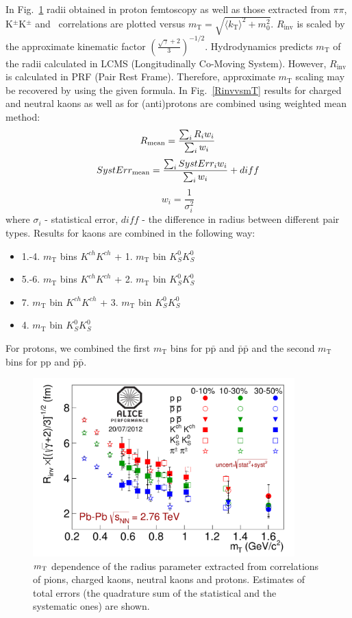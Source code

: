 In Fig.~\ref{RinvvsmT2} radii obtained in proton femtoscopy as well as those extracted from $\pi\pi$, K$^{\pm}$K$^{\pm}$ and \Kzs\Kzs~correlations are plotted versus $m_{\mathrm{T}} = \sqrt{\langle k_{\mathrm{T}} \rangle^2+m_{\mathrm{0}}^2}$. $R_{\mathrm{inv}}$ is scaled by the approximate kinematic factor $(\frac{\sqrt{\gamma}+2}{3})^{-1/2}$. Hydrodynamics predicts $m_{\mathrm{T}}$ of the radii calculated in LCMS (Longitudinally Co-Moving System). However, $R_{\mathrm{inv}}$ is calculated in PRF (Pair Rest Frame). Therefore, approximate $m_{\mathrm{T}}$ scaling may be recovered by using the given formula.
In Fig.~\ref{RinvvsmT} results for charged and neutral kaons as well as for (anti)protons are combined using weighted mean method:
\begin{equation}
  R_{\rm mean}=\frac{\sum_i R_i w_i}{\sum_i w_i}
  \nonumber
\end{equation}
\begin{equation}
  SystErr_{\rm mean}=\frac{\sum_i SystErr_i w_i}{\sum_i w_i}+diff
  \nonumber
\end{equation}\begin{equation}
  w_i=\frac{1}{\sigma_i^2}
  \nonumber
\end{equation}
where
$\sigma_i$ - statistical error, $diff$ - the difference in radius between different pair types. Results for kaons are combined in the following way:
\begin{itemize}
\item 1.-4. $m_\mathrm{T}$ bins $K^{ch}K^{ch}$ + 1. $m_\mathrm{T}$ bin $K_S^0K_S^0$
\item 5.-6. $m_\mathrm{T}$ bins $K^{ch}K^{ch}$ + 2. $m_\mathrm{T}$ bin $K_S^0K_S^0$
\item 7. $m_\mathrm{T}$ bin $K^{ch}K^{ch}$ + 3. $m_\mathrm{T}$ bin $K_S^0K_S^0$
\item 4. $m_\mathrm{T}$ bin $K_S^0K_S^0$
\end{itemize}
For protons, we combined the first $m_\mathrm{T}$ bins for p$\bar{\mathrm{p}}$ and $\bar{\mathrm{p}}\bar{\mathrm{p}}$  and the second  $m_\mathrm{T}$ bins for pp and $\bar{\mathrm{p}}\bar{\mathrm{p}}$.
\begin{figure}
  \centering
  \includegraphics[width=0.9\textwidth]{RinvvsmT2}
  \caption{$m_{\rm \mathrm{T}}$ dependence of the radius parameter extracted from correlations of pions, charged kaons, neutral kaons and protons. Estimates of total errors (the quadrature sum of the statistical and the systematic ones) are shown.}
  \label{RinvvsmT2}
\end{figure}

